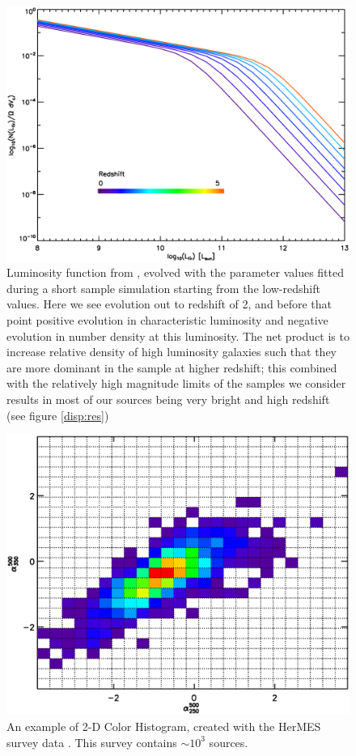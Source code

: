 \documentclass[twocolumn,letterpaper,10pt]{article}
\begin{document}
\begin{onecolumn}
\begin{figure}
\centering
\includegraphics[width=\textwidth]{sim_lumfunct.eps}
\caption{Luminosity function from \citet{negrello13}, evolved with the parameter values fitted during a short sample simulation starting from the low-redshift \citet{Caputi07} values. Here we see evolution out to redshift of 2, and before that point positive evolution in characteristic luminosity and negative evolution in number density at this luminosity. The net product is to increase relative density of high luminosity galaxies such that they are more dominant in the sample at higher redshift; this combined with the relatively high magnitude limits of the samples we consider results in most of our sources being very bright and high redshift (see figure \ref{disp:res})}
\label{lf}
\end{figure}

\begin{figure}
  \includegraphics[width=\textwidth]{obs_color_hist.eps}
  \caption{An example of 2-D Color Histogram, created with the HerMES survey data \citep{HerMES}. This survey contains $\sim 10^3$ sources.}
  \label{fig:hist1}
\end{figure}


\end{onecolumn}
\end{document}
